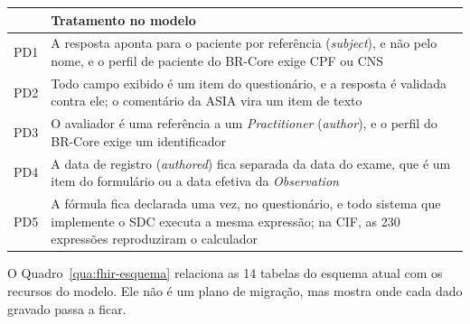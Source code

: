 \begin{quadro}[htb]
	\centering
	\caption{Problemas de dados e elementos do modelo que os tratam}
	\label{qua:fhir-problemas}
	\footnotesize
	\begin{tabularx}{\textwidth}{|l|>{\raggedright\arraybackslash}X|}
		\hline
		& Tratamento no modelo \\ \hline
		PD1 & A resposta aponta para o paciente por referência (\textit{subject}), e não pelo nome, e o perfil de
			paciente do BR-Core exige CPF ou CNS \\ \hline
		PD2 & Todo campo exibido é um item do questionário, e a resposta é validada contra ele; o comentário da ASIA vira
			um item de texto \\ \hline
		PD3 & O avaliador é uma referência a um \textit{Practitioner} (\textit{author}), e o perfil do BR-Core exige
			um identificador \\ \hline
		PD4 & A data de registro (\textit{authored}) fica separada da data do exame, que é um item do formulário ou a
			data efetiva da \textit{Observation} \\ \hline
		PD5 & A fórmula fica declarada uma vez, no questionário, e todo sistema que implemente o SDC executa a mesma
			expressão; na CIF, as 230 expressões reproduziram o calculador \\ \hline
	\end{tabularx}
\end{quadro}

O Quadro~\ref{qua:fhir-esquema} relaciona as 14 tabelas do esquema atual com os recursos do modelo. Ele não é um plano
de migração, mas mostra onde cada dado gravado passa a ficar.

